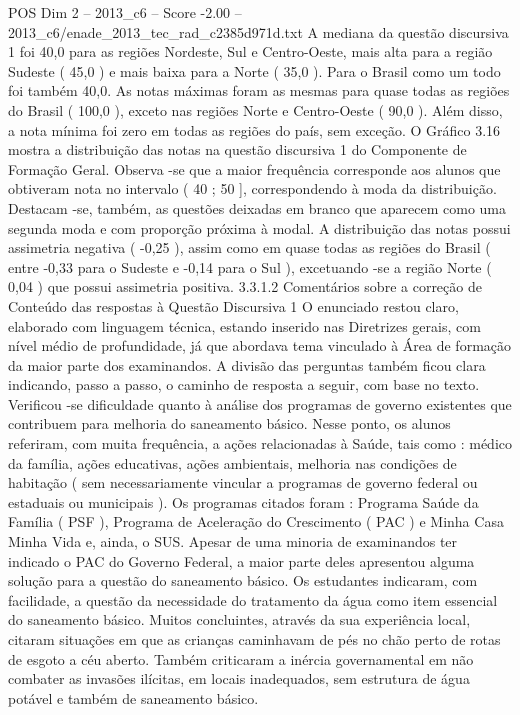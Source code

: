\begin{textsample}{POS Dim 2 – 2013\_c6 – Score -2.00 – 2013\_c6/enade\_2013\_tec\_rad\_c2385d971d.txt}
A mediana da questão discursiva 1 foi 40,0 para as regiões Nordeste, Sul e Centro-Oeste, mais alta para a região Sudeste ( 45,0 ) e mais baixa para a Norte ( 35,0 ).
Para o Brasil como um todo foi também 40,0.
As notas máximas foram as mesmas para quase todas as regiões do Brasil ( 100,0 ), exceto nas regiões Norte e Centro-Oeste ( 90,0 ).
Além disso, a nota mínima foi zero em todas as regiões do país, sem exceção.
O Gráfico 3.16 mostra a distribuição das notas na questão discursiva 1 do Componente de Formação Geral.
Observa -se que a maior frequência corresponde aos alunos que obtiveram nota no intervalo ( 40 ; 50 ], correspondendo à moda da distribuição.
Destacam -se, também, as questões deixadas em branco que aparecem como uma segunda moda e com proporção próxima à modal.
A distribuição das notas possui assimetria negativa ( -0,25 ), assim como em quase todas as regiões do Brasil ( entre -0,33 para o Sudeste e -0,14 para o Sul ), excetuando -se a região Norte ( 0,04 ) que possui assimetria positiva. 3.3.1.2 Comentários sobre a correção de Conteúdo das respostas à Questão Discursiva 1 O enunciado restou claro, elaborado com linguagem técnica, estando inserido nas Diretrizes gerais, com nível médio de profundidade, já que abordava tema vinculado à Área de formação da maior parte dos examinandos.
A divisão das perguntas também ficou clara indicando, passo a passo, o caminho de resposta a seguir, com base no texto.
Verificou -se dificuldade quanto à análise dos programas de governo existentes que contribuem para melhoria do saneamento básico.
Nesse ponto, os alunos referiram, com muita frequência, a ações relacionadas à Saúde, tais como : médico da família, ações educativas, ações ambientais, melhoria nas condições de habitação ( sem necessariamente vincular a programas de governo federal ou estaduais ou municipais ).
Os programas citados foram : Programa Saúde da Família ( PSF ), Programa de Aceleração do Crescimento ( PAC ) e Minha Casa Minha Vida e, ainda, o SUS.
Apesar de uma minoria de examinandos ter indicado o PAC do Governo Federal, a maior parte deles apresentou alguma solução para a questão do saneamento básico.
Os estudantes indicaram, com facilidade, a questão da necessidade do tratamento da água como item essencial do saneamento básico.
Muitos concluintes, através da sua experiência local, citaram situações em que as crianças caminhavam de pés no chão perto de rotas de esgoto a céu aberto.
Também criticaram a inércia governamental em não combater as invasões ilícitas, em locais inadequados, sem estrutura de água potável e também de saneamento básico.

\end{textsample}
